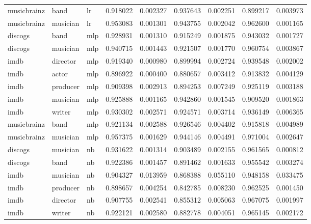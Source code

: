 \documentclass[epsfig,a4paper,11pt,titlepage,twoside,openany]{book}
\begin{document}
\begin{longtable}{|l|l|l|l|l|l|l|l|l|}
musicbrainz & band     & lr & 0.918022 & 0.002327 & 0.937643  & 0.002251 & 0.899217    & 0.003973   \\
musicbrainz & musician & lr & 0.953083 & 0.001301 & 0.943755  & 0.002042 & 0.962600    & 0.001165   \\ \hline
discogs     & band     & mlp                  & 0.928931 & 0.001310 & 0.915249  & 0.001875 & 0.943032    & 0.001727   \\
discogs     & musician & mlp                  & 0.940715 & 0.001443 & 0.921507  & 0.001770 & 0.960754    & 0.003867   \\
imdb        & director & mlp                  & 0.919340 & 0.000980 & 0.899994  & 0.002724 & 0.939548    & 0.002002   \\
imdb        & actor    & mlp                  & 0.896922 & 0.000400 & 0.880657  & 0.003412 & 0.913832    & 0.004129   \\
imdb        & producer & mlp                  & 0.909398 & 0.002913 & 0.894253  & 0.007249 & 0.925119    & 0.003188   \\
imdb        & musician & mlp                  & 0.925888 & 0.001165 & 0.942860  & 0.001545 & 0.909520    & 0.001863   \\
imdb        & writer   & mlp                  & 0.930302 & 0.002571 & 0.924571  & 0.003714 & 0.936149    & 0.006365   \\
musicbrainz & band     & mlp                  & 0.921134 & 0.002588 & 0.926546  & 0.004402 & 0.915818    & 0.004989   \\
musicbrainz & musician & mlp                  & 0.957375 & 0.001629 & 0.944146  & 0.004491 & 0.971004    & 0.002647   \\ \hline
discogs     & musician & nb         & 0.931622 & 0.001314 & 0.903489  & 0.002155 & 0.961565    & 0.000812   \\
discogs     & band     & nb         & 0.922386 & 0.001457 & 0.891462  & 0.001633 & 0.955542    & 0.003274   \\
imdb        & musician & nb         & 0.904327 & 0.013959 & 0.868388  & 0.055110 & 0.948158    & 0.033475   \\
imdb        & producer & nb         & 0.898657 & 0.004254 & 0.842785  & 0.008230 & 0.962525    & 0.001450   \\
imdb        & director & nb         & 0.907755 & 0.002541 & 0.855312  & 0.005063 & 0.967075    & 0.001997   \\
imdb        & writer   & nb         & 0.922121 & 0.002580 & 0.882778  & 0.004051 & 0.965145    & 0.002172   \\

\end{longtable}
\end{document}
